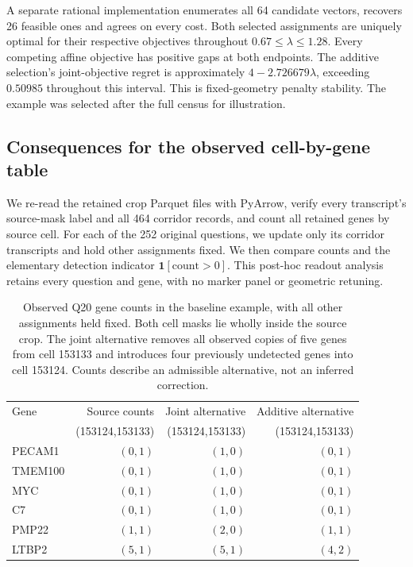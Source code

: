 \documentclass[10pt,letterpaper]{article}
\begin{document}
A separate rational implementation enumerates all 64 candidate vectors, recovers 26 feasible ones and agrees on every cost. Both selected assignments are uniquely optimal for their respective objectives throughout $0.67\le\lambda\le1.28$. Every competing affine objective has positive gaps at both endpoints. The additive selection's joint-objective regret is approximately $4-2.726679\lambda$, exceeding $0.50985$ throughout this interval. This is fixed-geometry penalty stability. The example was selected after the full census for illustration.

\subsection{Consequences for the observed cell-by-gene table}
We re-read the retained crop Parquet files with PyArrow, verify every transcript's source-mask label and all 464 corridor records, and count all retained genes by source cell. For each of the 252 original questions, we update only its corridor transcripts and hold other assignments fixed. We then compare counts and the elementary detection indicator $\mathbf1[\text{count}>0]$. This post-hoc readout analysis retains every question and gene, with no marker panel or geometric retuning.

\begin{table}[H]\centering
\begin{tabular}{lrrr}\toprule
Gene & Source counts & Joint alternative & Additive alternative\\
 & (153124,153133) & (153124,153133) & (153124,153133)\\\midrule
PECAM1 &$(0,1)$&$(1,0)$&$(0,1)$\\
TMEM100 &$(0,1)$&$(1,0)$&$(0,1)$\\
MYC &$(0,1)$&$(1,0)$&$(0,1)$\\
C7 &$(0,1)$&$(1,0)$&$(0,1)$\\
PMP22 &$(1,1)$&$(2,0)$&$(1,1)$\\
LTBP2 &$(5,1)$&$(5,1)$&$(4,2)$\\\bottomrule
\end{tabular}
\caption{Observed Q20 gene counts in the baseline example, with all other assignments held fixed. Both cell masks lie wholly inside the source crop. The joint alternative removes all observed copies of five genes from cell 153133 and introduces four previously undetected genes into cell 153124. Counts describe an admissible alternative, not an inferred correction.}\label{tab:readout}
\end{table}
\end{document}
